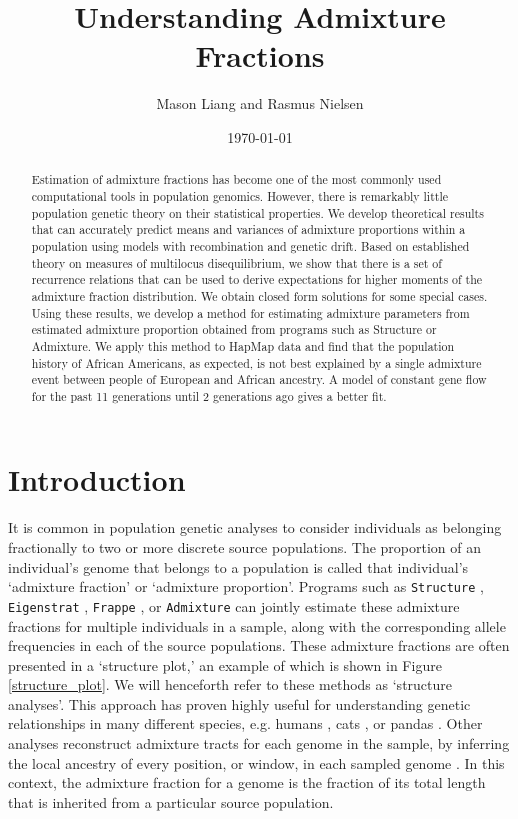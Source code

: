 \documentclass[11pt]{amsart}
\title{Understanding Admixture Fractions}
\author{Mason Liang and Rasmus Nielsen}
\date{\today}
\begin{document}
\begin{abstract}
Estimation of admixture fractions has become one of the most commonly used computational tools in population genomics.  However, there is remarkably little population genetic theory on their statistical properties.  We develop theoretical results that can accurately predict means and variances of admixture proportions within a population using models with recombination and genetic drift. Based on established theory on measures of multilocus disequilibrium, we show that there is a set of recurrence relations that can be used to derive expectations for higher moments of the admixture fraction distribution. We obtain closed form solutions for some special cases. Using these results, we develop a method for estimating admixture parameters from estimated admixture proportion obtained from programs such as Structure or Admixture. We apply this method to HapMap data and find that the population history of African Americans, as expected, is not best explained by a single admixture event between people of European and African ancestry. A model of constant gene flow for the past 11 generations until 2 generations ago gives a better fit.
\end{abstract}
\maketitle

\section*{Introduction}
It is common in population genetic analyses to consider individuals as belonging fractionally to two or more discrete source populations. The proportion of an individual's genome that belongs to a population is called that individual's `admixture fraction' or `admixture proportion'. Programs such as \verb|Structure| \citep{pritchard2000inference}, \verb|Eigenstrat| \citep{price2006principal}, \verb|Frappe| \citep{tang2005estimation}, or \verb|Admixture| \citep{alexander2009fast} can jointly estimate these admixture fractions for multiple individuals in a sample, along with the corresponding  allele frequencies in each of the source populations. These admixture fractions are often presented in a `structure plot,' an example of which is shown in Figure \ref{structure_plot}. We will henceforth refer to these methods as `structure analyses'. 
This approach has proven highly useful for understanding genetic relationships in many different species, e.g. humans \citep{rosenberg2002genetic}, cats \citep{menotti2008patterns}, or pandas \citep{zhang2007genetic}. Other analyses reconstruct admixture tracts for each genome in the sample, by inferring the local ancestry of every position, or window, in each sampled genome \citep{tang2006reconstructing,maples2013rfmix}. In this context, the admixture fraction for a genome is the fraction of its total length that is inherited from a particular source population. 
\end{document}
